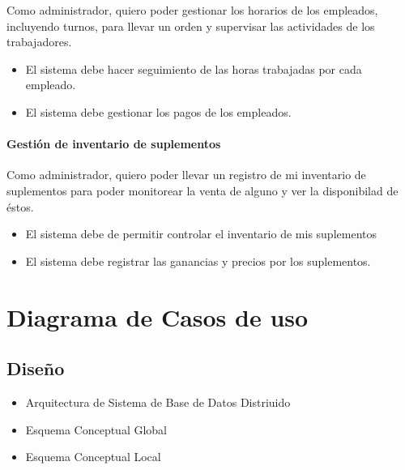 \documentclass[spanish, 12pt]{article}
\providecommand{\tightlist}{\setlength{\itemsep}{0pt}
\setlength{\parskip}{0pt}}
\begin{document}
	Como administrador, quiero poder gestionar los horarios de los empleados, incluyendo
	turnos, para llevar un orden y supervisar las actividades de los trabajadores.

	\begin{itemize}
		\tightlist

		\item El sistema debe hacer seguimiento de las horas trabajadas por cada empleado.

		\item El sistema debe gestionar los pagos de los empleados.
	\end{itemize}

	\paragraph{Gestión de inventario de suplementos}
	\label{gestiuxf3n-de-inventario-de-suplementos}

	Como administrador, quiero poder llevar un registro de mi inventario de
	suplementos para poder monitorear la venta de alguno y ver la disponibilad de
	éstos.

	\begin{itemize}
		\tightlist

		\item El sistema debe de permitir controlar el inventario de mis suplementos

		\item El sistema debe registrar las ganancias y precios por los suplementos.
	\end{itemize}

	\section{Diagrama de Casos de uso}
	\label{diagrama-de-casos-de-uso}

	\subsection{Diseño}
	\label{diseuxf1o}

	\begin{itemize}
		\tightlist

		\item Arquitectura de Sistema de Base de Datos Distriuido

		\item Esquema Conceptual Global

		\item Esquema Conceptual Local
	\end{itemize}
\end{document}
